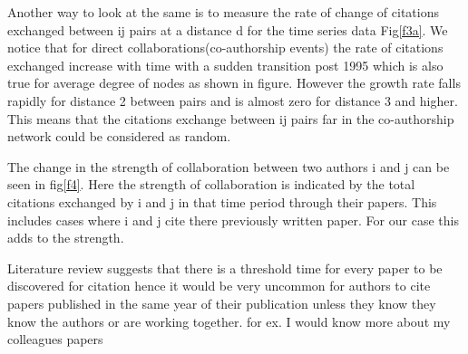 \documentclass[aps, pre, twocolumn, nofootinbib]{revtex4-1}
\begin{document}
Another way to look at the same is to measure the rate of change of citations exchanged between ij pairs at a distance d for the time series data Fig\ref{f3a}. We notice that for direct collaborations(co-authorship events) the rate of citations exchanged increase with time with a sudden transition post 1995 which is also true for average degree of nodes as shown in figure. However the growth rate falls rapidly for distance 2 between pairs and is almost zero for distance 3 and higher. {\color{blue}This means that the citations exchange between ij pairs far in the co-authorship network could be considered as random.}

The change in the strength of collaboration between two authors i and j can be seen in fig\ref{f4}. Here the strength of collaboration is indicated by the total citations exchanged by i and j in that time period through their papers. This includes cases where i and j cite there previously written paper. For our case this adds to the strength. 

{\color{red}Literature review suggests that there is a threshold time for every paper to be discovered for citation hence it would be very uncommon for authors to cite papers published in the same year of their publication unless they know they know the authors or are working together. for ex. I would know more about my colleagues papers}
\end{document}
